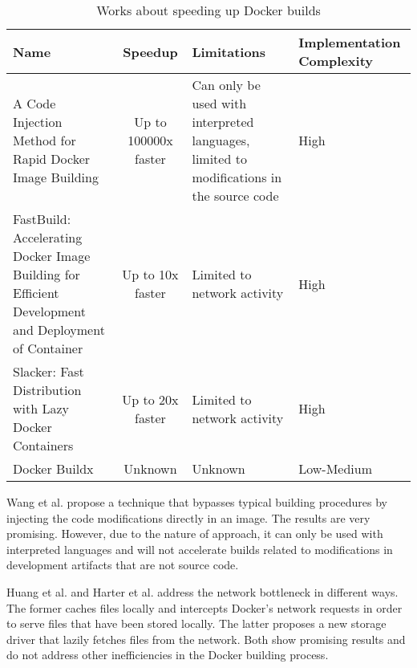 \begin{table}[H]
    \centering
    \begin{tabular}{|p{}|c|p{}|p{}|}
        \hline \textbf{Name} & \textbf{Speedup} & \textbf{Limitations} & \textbf{Implementation Complexity} \\
        \hline A Code Injection Method for Rapid Docker Image Building \cite{wangCodeInjectionMethod2019} & Up to 100000x faster & Can only be used with interpreted languages, limited to modifications in the source code & High \\
        \hline FastBuild: Accelerating Docker Image Building for Efficient Development and Deployment of Container \cite{huangFastBuildAcceleratingDocker2019} & Up to 10x faster & Limited to network activity & High \\
        \hline Slacker: Fast Distribution with Lazy Docker Containers \cite{harterSlackerFastDistribution} & Up to 20x faster & Limited to network activity & High \\
        \hline Docker Buildx \footnotemark{} & Unknown & Unknown & Low-Medium \\
        \hline
    \end{tabular}
    \caption{Works about speeding up Docker builds}
    \label{tab:works_speeding_up}
\end{table}



Wang et al. \cite{wangCodeInjectionMethod2019} propose a technique that bypasses typical building procedures by injecting the code modifications directly in an image. The results are very promising. However, due to the nature of approach, it can only be used with interpreted languages and will not accelerate builds related to modifications in development artifacts that are not source code.

Huang et al. \cite{huangFastBuildAcceleratingDocker2019} and Harter et al. \cite{harterSlackerFastDistribution} address the network bottleneck in different ways. The former caches files locally and intercepts Docker's network requests in order to serve files that have been stored locally. The latter proposes a new storage driver that lazily fetches files from the network. Both show promising results and do not address other inefficiencies in the Docker building process.

